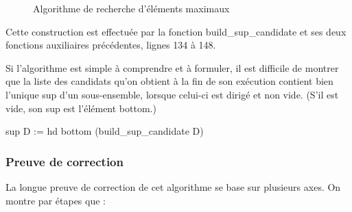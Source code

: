 \documentclass{article}
\newcommand\code[1]{{\fontfamily{lmtt}\selectfont #1}}
\theoremstyle{definition}
\begin{document}
\begin{figure}[ht]
{
	}
\caption{Algorithme de recherche d'éléments maximaux}
\end{figure}


Cette construction est effectuée par la fonction \code{build\_sup\_candidate} et ses deux fonctions auxiliaires précédentes, lignes 134 à 148. 

Si l'algorithme est simple à comprendre et à formuler, il est difficile de montrer que la liste des candidats qu'on obtient à la fin de son exécution contient bien l'unique sup d'un sous-ensemble, lorsque celui-ci est dirigé et non vide. (S'il est vide, son sup est l'élément bottom.)

\begin{coq}
sup D := hd bottom (build_sup_candidate D)
\end{coq}


\subsubsection{Preuve de correction}

La longue preuve de correction de cet algorithme se base sur plusieurs axes. On montre par étapes que :
\end{document}
